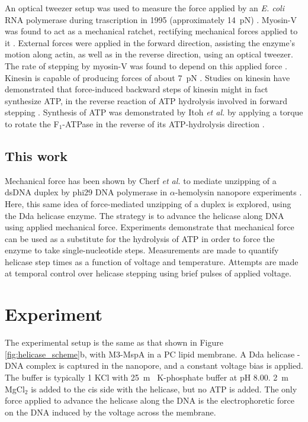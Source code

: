 An optical tweezer setup was used to measure the force applied by an \textit{E. coli} RNA polymerase during trascription in 1995 (approximately \SI{14}{\pico\N}) \citep{Yin1995}.  Myosin-V was found to act as a mechanical ratchet, rectifying mechanical forces applied to it \citep{Gebhardt2006}.  External forces were applied in the forward direction, assisting the enzyme's motion along actin, as well as in the reverse direction, using an optical tweezer.  The rate of stepping by myosin-V was found to depend on this applied force \citep{Clemen2005}.  Kinesin is capable of producing forces of about \SI{7}{\pico\N} \citep{Higuchi1997}.  Studies on kinesin have demonstrated that force-induced backward steps of kinesin might in fact synthesize ATP, in the reverse reaction of ATP hydrolysis involved in forward stepping \citep{Hyeon2009}.  Synthesis of ATP was demonstrated by Itoh \textit{et al.} by applying a torque to rotate the F$_1$-ATPase in the reverse of its ATP-hydrolysis direction \citep{Itoh2004}.

\subsection{This work}

Mechanical force has been shown by Cherf \textit{et al.} to mediate unzipping of a dsDNA duplex by phi29 DNA polymerase in $\alpha$-hemolysin nanopore experiments \citep{Cherf2012}.  Here, this same idea of force-mediated unzipping of a duplex is explored, using the Dda helicase enzyme.  The strategy is to advance the helicase along DNA using applied mechanical force.  Experiments demonstrate that mechanical force can be used as a substitute for the hydrolysis of ATP in order to force the enzyme to take single-nucleotide steps.  Measurements are made to quantify helicase step times as a function of voltage and temperature.  Attempts are made at temporal control over helicase stepping using brief pulses of applied voltage.


\section{Experiment}

The experimental setup is the same as that shown in Figure \ref{fig:helicase_scheme}b, with M3-MspA in a PC lipid membrane.  A Dda helicase - DNA complex is captured in the nanopore, and a constant voltage bias is applied.  The buffer is typically \SI{1}{\Molar} KCl with \SI{25}{\m\Molar} K-phosphate buffer at pH \num{8.00}.  \SI{2}{\m\Molar} MgCl$_2$ is added to the cis side with the helicase, but no ATP is added.  The only force applied to advance the helicase along the DNA is the electrophoretic force on the DNA induced by the voltage across the membrane.

